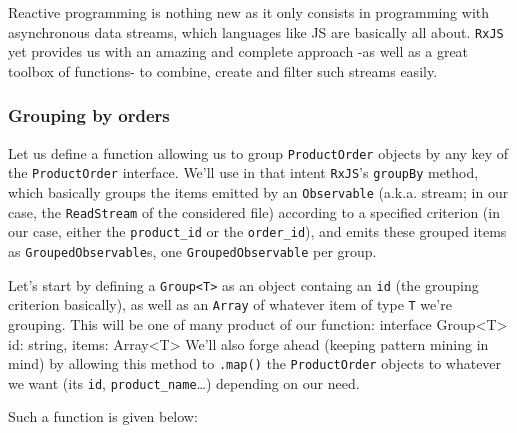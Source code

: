 \documentclass[11pt]{article}
\begin{document}
Reactive programming is nothing new as it only consists in programming
with asynchronous data streams, which languages like JS are basically
all about. \texttt{RxJS} yet provides us with an amazing and complete
approach -as well as a great toolbox of functions- to combine, create
and filter such streams easily.

    \hypertarget{grouping-by-orders}{%
\subsubsection{Grouping by orders}\label{grouping-by-orders}}

Let us define a function allowing us to group \texttt{ProductOrder}
objects by any key of the \texttt{ProductOrder} interface. We'll use in
that intent \texttt{RxJS}'s \texttt{groupBy} method, which basically
groups the items emitted by an \texttt{Observable} (a.k.a. stream; in
our case, the \texttt{ReadStream} of the considered file) according to a
specified criterion (in our case, either the \texttt{product\_id} or the
\texttt{order\_id}), and emits these grouped items as
\texttt{GroupedObservable}s, one \texttt{GroupedObservable} per group.

Let's start by defining a \texttt{Group\textless{}T\textgreater{}} as an
object containg an \texttt{id} (the grouping criterion basically), as
well as an \texttt{Array} of whatever item of type \texttt{T} we're
grouping. This will be one of many product of our function:
interface Group<T> {
    id: string,
    items: Array<T>
}
    We'll also forge ahead (keeping pattern mining in mind) by allowing this
method to \texttt{.map()} the \texttt{ProductOrder} objects to whatever
we want (its \texttt{id}, \texttt{product\_name}\ldots{}) depending on
our need.

Such a function is given below:
\end{document}
